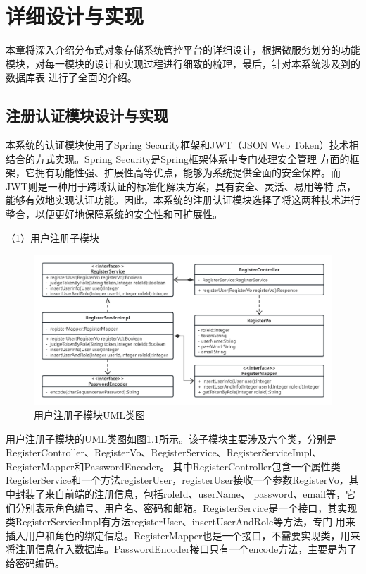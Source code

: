 \chapter{详细设计与实现}

本章将深入介绍分布式对象存储系统管控平台的详细设计，根据微服务划分的功能模块，对每一模块的设计和实现过程进行细致的梳理，最后，针对本系统涉及到的数据库表
进行了全面的介绍。

\section{注册认证模块设计与实现}

本系统的认证模块使用了Spring Security框架和JWT（JSON Web Token）技术相结合的方式实现\cite{k256eji}。Spring Security是Spring框架体系中专门处理安全管理
方面的框架，它拥有功能性强、扩展性高等优点，能够为系统提供全面的安全保障。而JWT则是一种用于跨域认证的标准化解决方案，具有安全、灵活、易用等特
点，能够有效地实现认证功能。因此，本系统的注册认证模块选择了将这两种技术进行整合，以便更好地保障系统的安全性和可扩展性。

（1）用户注册子模块

\begin{figure}[htb]
    \centering
    \includegraphics[width=1\textwidth]{my_figures/chapter5/用户注册子模块UML类图.png}
    \caption{用户注册子模块UML类图}
    \label{fig:用户注册子模块UML类图}
\end{figure}

用户注册子模块的UML类图如图\ref{fig:用户注册子模块UML类图}所示。该子模块主要涉及六个类，分别是RegisterController、RegisterVo、RegisterService、RegisterServiceImpl、RegisterMapper和PasswordEncoder。
其中RegisterController包含一个属性类RegisterService和一个方法registerUser，registerUser接收一个参数RegisterVo，其中封装了来自前端的注册信息，包括roleId、userName、
password、email等，它们分别表示角色编号、用户名、密码和邮箱。RegisterService是一个接口，其实现类RegisterServiceImpl有方法registerUser、insertUserAndRole等方法，专门
用来插入用户和角色的绑定信息。RegisterMapper也是一个接口，不需要实现类，用来将注册信息存入数据库。PasswordEncoder接口只有一个encode方法，主要是为了给密码编码。



